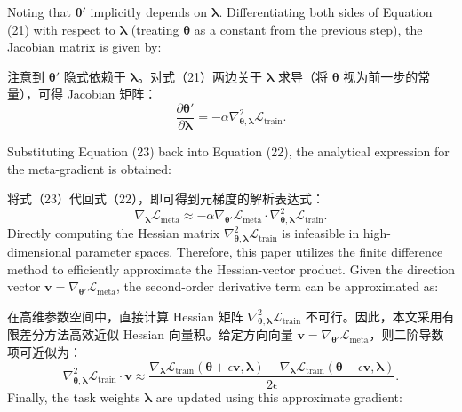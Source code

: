 \documentclass[11pt]{article}
\begin{document}
Noting that $\boldsymbol{\theta}'$ implicitly depends on $\boldsymbol{\lambda}$. Differentiating both sides of Equation (21) with respect to $\boldsymbol{\lambda}$ (treating $\boldsymbol{\theta}$ as a constant from the previous step), the Jacobian matrix is given by:

注意到 $\boldsymbol{\theta}'$ 隐式依赖于 $\boldsymbol{\lambda}$。对式（21）两边关于 $\boldsymbol{\lambda}$ 求导（将 $\boldsymbol{\theta}$ 视为前一步的常量），可得 Jacobian 矩阵：
\begin{equation}
	\frac{\partial \boldsymbol{{\theta }'}}{\partial \boldsymbol{\lambda }}=-\alpha \nabla _{\boldsymbol{\theta },\boldsymbol{\lambda }}^{2}{{\mathcal{L}}_{\text{train}}}.
\end{equation}

Substituting Equation (23) back into Equation (22), the analytical expression for the meta-gradient is obtained:

将式（23）代回式（22），即可得到元梯度的解析表达式：
\begin{equation}
	{{\nabla }_{\boldsymbol{\lambda }}}{{\mathcal{L}}_{\text{meta}}}\approx -\alpha {{\nabla }_{{\boldsymbol{{\theta }'}}}}{{\mathcal{L}}_{\text{meta}}}\cdot \nabla _{\boldsymbol{\theta },\boldsymbol{\lambda }}^{2}{{\mathcal{L}}_{\text{train}}}.
\end{equation}
Directly computing the Hessian matrix $\nabla_{\boldsymbol{\theta}, \boldsymbol{\lambda}}^2 \mathcal{L}_{\text{train}}$ is infeasible in high-dimensional parameter spaces. Therefore, this paper utilizes the finite difference method to efficiently approximate the Hessian-vector product. Given the direction vector $\mathbf{v} = \nabla_{\boldsymbol{\theta}'} \mathcal{L}_{\text{meta}}$, the second-order derivative term can be approximated as:

在高维参数空间中，直接计算 Hessian 矩阵 $\nabla_{\boldsymbol{\theta}, \boldsymbol{\lambda}}^2 \mathcal{L}_{\text{train}}$ 不可行。因此，本文采用有限差分方法高效近似 Hessian 向量积。给定方向向量 $\mathbf{v} = \nabla_{\boldsymbol{\theta}'} \mathcal{L}_{\text{meta}}$，则二阶导数项可近似为：
\begin{equation}
	\nabla _{\boldsymbol{\theta },\boldsymbol{\lambda }}^{2}{{\mathcal{L}}_{\text{train}}}\cdot \mathbf{v}\approx \frac{{{\nabla }_{\boldsymbol{\lambda }}}{{\mathcal{L}}_{\text{train}}}(\boldsymbol{\theta }+\epsilon \mathbf{v},\boldsymbol{\lambda })-{{\nabla }_{\boldsymbol{\lambda }}}{{\mathcal{L}}_{\text{train}}}(\boldsymbol{\theta }-\epsilon \mathbf{v},\boldsymbol{\lambda })}{2\epsilon }.
\end{equation}
Finally, the task weights $\boldsymbol{\lambda}$ are updated using this approximate gradient:
\end{document}
